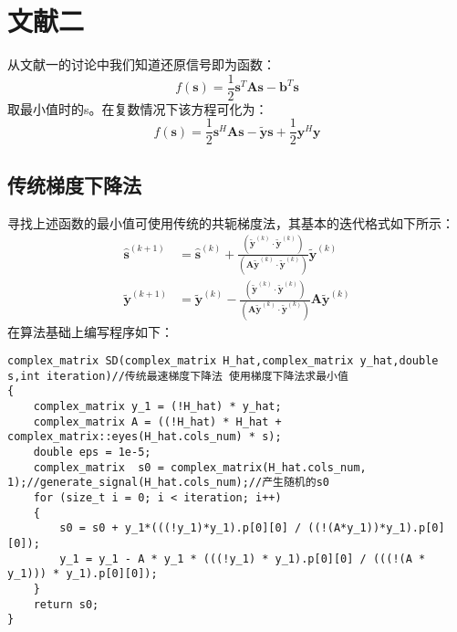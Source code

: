 \documentclass[twocolumn]{ctexart}
\begin{document}
\section{文献二}
\par 从文献一的讨论中我们知道还原信号即为函数：
\[f(\mathbf{s})=\frac{1}{2} \mathbf{s}^{T} \mathbf{A s}-\mathbf{b}^{T} \mathbf{s}\]取最小值时的s。在复数情况下该方程可化为：
\[f(\mathbf{s})=\frac{1}{2} \mathbf{s}^{H} \mathbf{A} \mathbf{s}-\tilde{\mathbf{y}} \mathbf{s}+\frac{1}{2} \mathbf{y}^{H} \mathbf{y}\]
\subsection{传统梯度下降法}
\par 寻找上述函数的最小值可使用传统的共轭梯度法，其基本的迭代格式如下所示：
\[\begin{aligned}
\hat{\mathbf{s}}^{(k+1)} &=\hat{\mathbf{s}}^{(k)}+\frac{\left(\tilde{\mathbf{y}}^{(k)} \cdot \tilde{\mathbf{y}}^{(k)}\right)}{\left(\mathbf{A} \tilde{\mathbf{y}}^{(k)} \cdot \tilde{\mathbf{y}}^{(k)}\right)} \tilde{\mathbf{y}}^{(k)} \\
\tilde{\mathbf{y}}^{(k+1)} &=\tilde{\mathbf{y}}^{(k)}-\frac{\left(\tilde{\mathbf{y}}^{(k)} \cdot \tilde{\mathbf{y}}^{(k)}\right)}{\left(\mathbf{A} \tilde{\mathbf{y}}^{(k)} \cdot \tilde{\mathbf{y}}^{(k)}\right)} \mathbf{A} \tilde{\mathbf{y}}^{(k)}
\end{aligned}\]
在算法基础上编写程序如下：
\begin{lstlisting}
complex_matrix SD(complex_matrix H_hat,complex_matrix y_hat,double s,int iteration)//传统最速梯度下降法 使用梯度下降法求最小值
{
	complex_matrix y_1 = (!H_hat) * y_hat;
	complex_matrix A = ((!H_hat) * H_hat + complex_matrix::eyes(H_hat.cols_num) * s);
	double eps = 1e-5;
	complex_matrix  s0 = complex_matrix(H_hat.cols_num, 1);//generate_signal(H_hat.cols_num);//产生随机的s0
	for (size_t i = 0; i < iteration; i++)
	{
		s0 = s0 + y_1*(((!y_1)*y_1).p[0][0] / ((!(A*y_1))*y_1).p[0][0]);
		y_1 = y_1 - A * y_1 * (((!y_1) * y_1).p[0][0] / (((!(A * y_1))) * y_1).p[0][0]);
	}
	return s0;
}
\end{lstlisting}
\end{document}
